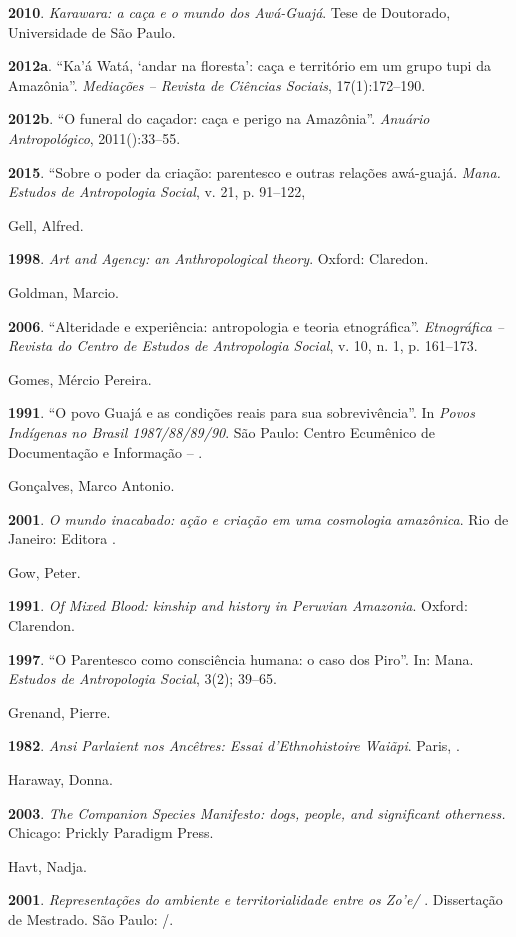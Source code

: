 \begin{Parskip}
\textbf{2010}. \emph{Karawara: a caça e o mundo dos Awá-Guajá}. Tese de
Doutorado, Universidade de São Paulo.

\textbf{2012a}. ``Ka'á Watá, `andar na floresta': caça e território em
um grupo tupi da Amazônia''. \emph{Mediações -- Revista de Ciências
Sociais}, 17(1):172--190.

\textbf{2012b}. ``O funeral do caçador: caça e perigo na Amazônia''.
\emph{Anuário Antropológico}, 2011():33--55.

\textbf{2015}. ``Sobre o poder da criação: parentesco e outras relações
awá-guajá. \emph{Mana. Estudos de Antropologia Social}, v. 21, p.
91--122,

Gell, Alfred.

\textbf{1998}. \emph{Art and Agency: an Anthropological theory}. Oxford:
Claredon.

Goldman, Marcio.

\textbf{2006}. ``Alteridade e experiência: antropologia e teoria
etnográfica''. \emph{Etnográfica -- Revista do Centro de Estudos de
Antropologia Social}, v. 10, n. 1, p. 161--173.

Gomes, Mércio Pereira.

\textbf{1991}. ``O povo Guajá e as condições reais para sua
sobrevivência''. In \emph{Povos Indígenas no Brasil 1987/88/89/90}. São
Paulo: Centro Ecumênico de Documentação e Informação -- .

Gonçalves, Marco Antonio.

\textbf{2001}. \emph{O mundo inacabado: ação e criação em uma cosmologia
amazônica}. Rio de Janeiro: Editora .

Gow, Peter.

\textbf{1991}. \emph{Of Mixed Blood: kinship and history in Peruvian
Amazonia}. Oxford: Clarendon.

\textbf{1997}. ``O Parentesco como consciência humana: o caso dos Piro''.
In: Mana. \emph{Estudos de Antropologia Social}, 3(2); 39--65.

Grenand, Pierre.

\textbf{1982}. \emph{Ansi Parlaient nos Ancêtres: Essai d'Ethnohistoire
Waiãpi}. Paris, .

Haraway, Donna.

\textbf{2003}. \emph{The Companion Species Manifesto: dogs, people, and
significant otherness.} Chicago: Prickly Paradigm Press.

Havt, Nadja.

\textbf{2001}. \emph{Representações do ambiente e territorialidade entre
os Zo'e/ }. Dissertação de Mestrado. São Paulo: /.


\end{Parskip}
